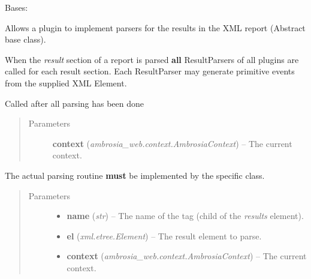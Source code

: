 \documentclass[letterpaper,10pt,english]{sphinxmanual}
\begin{document}
\begin{fulllineitems}
\label{ambrosia:ambrosia.ResultParser}
Bases: 

Allows a plugin to implement parsers for the results in the XML report (Abstract base class).

When the \emph{result} section of a report is parsed \textbf{all} ResultParsers of all plugins are called for each result
section. Each ResultParser may generate primitive events from the supplied XML Element.

\begin{fulllineitems}
\label{ambrosia:ambrosia.ResultParser.finish}
Called after all parsing has been done
\begin{quote}\begin{description}
\item[{Parameters}] \leavevmode
\textbf{context} (\emph{ambrosia\_web.context.AmbrosiaContext}) -- The current context.

\end{description}\end{quote}

\end{fulllineitems}


\begin{fulllineitems}
\label{ambrosia:ambrosia.ResultParser.parse}
The actual parsing routine \textbf{must} be implemented by the specific class.
\begin{quote}\begin{description}
\item[{Parameters}] \leavevmode\begin{itemize}
\item {} 
\textbf{name} (\emph{str}) -- The name of the tag (child of the \emph{results} element).

\item {} 
\textbf{el} (\emph{xml.etree.Element}) -- The result element to parse.

\item {} 
\textbf{context} (\emph{ambrosia\_web.context.AmbrosiaContext}) -- The current context.

\end{itemize}


\end{description}
\end{quote}
\end{fulllineitems}
\end{fulllineitems}
\end{document}
